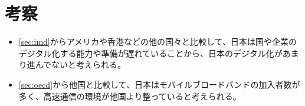 \documentclass[a4paper,11pt,dvipdfmx]{ujarticle}
\begin{document}
\section{考察}
\begin{itemize}
    \item \ref{sec:imd}からアメリカや香港などの他の国々と比較して、日本は国や企業のデジタル化する能力や準備が遅れていることから、日本のデジタル化があまり進んでないと考えられる。
    \item \ref{sec:oecd}から他国と比較して、日本はモバイルブロードバンドの加入者数が多く、高速通信の環境が他国より整っていると考えられる。
    
\end{itemize}
%

%


\end{document}
